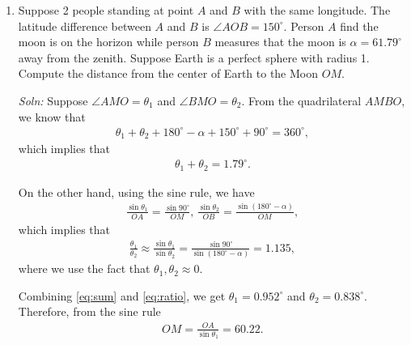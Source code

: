 \documentclass{article}
\begin{document}
\begin{enumerate}
\newpage
\item Suppose 2 people standing at point $A$ and $B$ with the same longitude. The latitude difference between $A$ and $B$ is $\angle AOB = 150^\circ$. Person $A$ find the moon is on the horizon while person $B$ measures that the moon is $\alpha = 61.79^\circ$ away from the zenith. Suppose Earth is a perfect sphere with radius 1. Compute the distance from the center of Earth to the Moon $OM$.
\begin{figure}[ht]
  \centering
\end{figure}

\emph{Soln:} Suppose $\angle AMO = \theta_1$ and $\angle BMO = \theta_2$. From the quadrilateral $AMBO$, we know that
\begin{align*}
 \theta_1+\theta_2 + 180^\circ - \alpha + 150^\circ + 90^\circ = 360^\circ,
\end{align*}
which implies that
\begin{align}
  \theta_1 + \theta_2 = 1.79^\circ.
  \label{eq:sum}
\end{align}

On the other hand, using the sine rule, we have
\begin{align*}
 \frac{\sin \theta_1}{OA} = \frac{\sin 90^\circ}{OM},\, \frac{\sin \theta_2}{OB} = \frac{\sin (180^\circ-\alpha)}{OM},
\end{align*}
which implies that
\begin{align}
 \frac{\theta_1}{\theta_2}\approx \frac{\sin\theta_1}{\sin\theta_2} = \frac{\sin 90^\circ}{\sin(180^\circ-\alpha)} = 1.135,
  \label{eq:ratio}
\end{align}
where we use the fact that $\theta_1,\theta_2\approx 0$.

Combining \eqref{eq:sum} and \eqref{eq:ratio}, we get $\theta_1 = 0.952^\circ$ and $\theta_2 = 0.838^\circ$. Therefore, from the sine rule
\begin{align*}
 OM = \frac{OA}{\sin\theta_1}  = 60.22.
\end{align*}



\end{enumerate}
\end{document}
